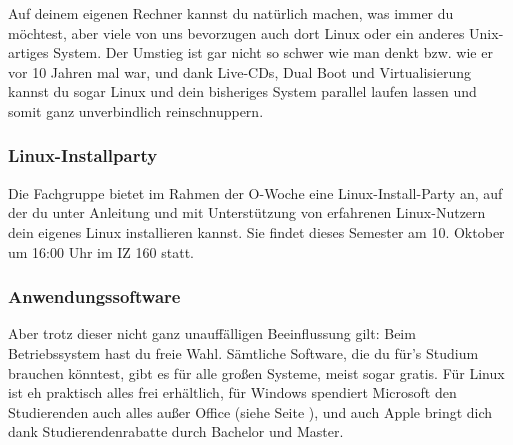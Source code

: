 	Auf deinem eigenen Rechner kannst du natürlich machen, was immer du möchtest, aber viele von uns bevorzugen auch dort Linux oder ein anderes Unix-artiges System. Der Umstieg ist gar nicht so schwer wie man denkt bzw. wie er vor 10 Jahren mal war, und dank Live-CDs, Dual Boot und Virtualisierung kannst du sogar Linux und dein bisheriges System parallel laufen lassen und somit ganz unverbindlich reinschnuppern.

        \subsubsection{Linux-Installparty}
	Die Fachgruppe bietet im Rahmen der O-Woche eine Linux-Install-Party an, auf der du unter Anleitung und mit Unterstützung von erfahrenen Linux-Nutzern dein eigenes Linux installieren kannst. Sie findet dieses Semester am 10. Oktober um 16:00 Uhr im IZ 160 statt. 

        \subsubsection{Anwendungssoftware}
			Aber trotz dieser nicht ganz unauffälligen Beeinflussung gilt: Beim Betriebssystem hast du freie Wahl. Sämtliche Software, die du für's Studium brauchen  könntest, gibt es für alle großen Systeme, meist sogar gratis. Für Linux ist eh  praktisch alles frei erhältlich, für Windows spendiert Microsoft den Studierenden auch alles außer Office (siehe Seite \pageref{msdnaa}), und auch Apple bringt dich dank Studierendenrabatte durch Bachelor und Master.

